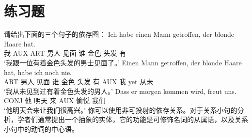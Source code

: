 \section*{练习题}
%
请给出下面的三个句子的依存图：
\eal
\ex 
\gll Ich habe einen Mann getroffen, der blonde Haare hat.\\
     我 AUX ART 男人 见面 谁 金色 头发 有\\
\glt `我跟一位有着金色头发的男士见面了。'
\ex 
\gll Einen Mann getroffen, der blonde Haare hat, habe ich noch nie.\\
     ART 男人 见面 谁 金色 头发 有 AUX 我 yet 从未\\
\glt `我从未见到过有着金色头发的男人。'
\ex 
\gll Dass er morgen kommen wird, freut uns.\\
     CONJ 他 明天 来 AUX 愉悦 我们\\
\glt `他明天会来让我们很高兴。'
\zl
你可以使用非可投射的依存关系。对于关系小句的分析，学者们通常提出一个抽象的实体，它的功能是可修饰名词的从属语，以及关系小句中的动词的中心语。
%
